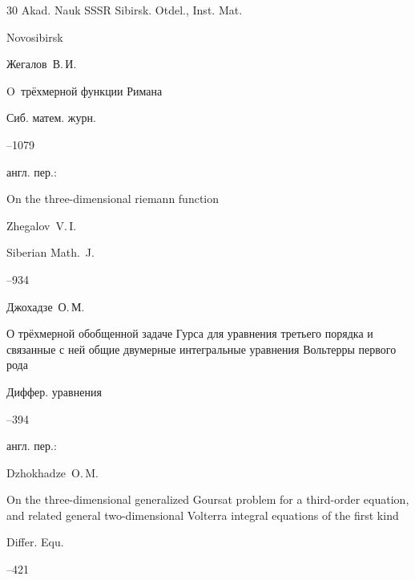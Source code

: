 \begin{thebibliography}{30}
\publ Akad. Nauk SSSR Sibirsk. Otdel., Inst. Mat.

\publaddr Novosibirsk





\by Жегалов~В.\,И.

\paper O~трёхмерной функции Римана

\jour Сиб. матем. журн.




--1079

\transl англ. пер.:~

\paper On the three-dimensional riemann function

\by Zhegalov~V.\,I.

\jour Siberian Math.~J.




--934



\pagebreak




\by Джохадзе~О.\,М.

\paper О трёхмерной обобщенной задаче Гурса для уравнения третьего порядка и связанные с ней общие  двумерные интегральные уравнения Вольтерры первого рода

\jour Диффер. уравнения




--394

\transl англ. пер.:~

\by Dzhokhadze~O.\,M. 

\paper On the three-dimensional generalized Goursat problem for a third-order equation, and related general two-dimensional Volterra integral equations of the first kind

\jour Differ. Equ.




–421 





\end{thebibliography}
